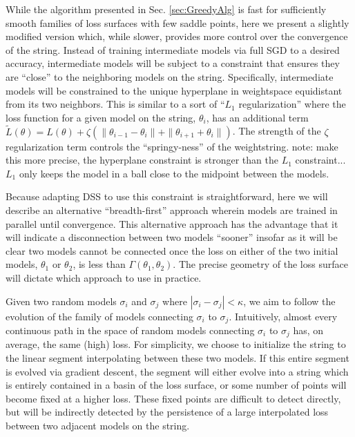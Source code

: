 \documentclass{article} %
\begin{document}
  While the algorithm presented in Sec. \ref{sec:GreedyAlg} is fast for sufficiently smooth families of loss surfaces with few saddle points, here we present a slightly modified version which, while slower, provides more control over the convergence of the string.  Instead of training intermediate models via full SGD to a desired accuracy, intermediate models will be subject to a constraint that ensures they are ``close'' to the neighboring models on the string.  Specifically, intermediate models will be constrained to the unique hyperplane in weightspace equidistant from its two neighbors.  This is similar to a sort of ``$L_1$ regularization'' where the loss function for a given model on the string, $\theta_i$, has an additional term $\tilde{L}(\theta) = L(\theta)+\zeta(\|\theta_{i-1} - \theta_i\|+\|\theta_{i+1} + \theta_i\|)$.  The strength of the $\zeta$ regularization term controls the ``springy-ness'' of the weightstring. note: make this more precise, the hyperplane constraint is stronger than the $L_1$ constraint...$L_1$ only keeps the model in a ball close to the midpoint between the models.
  
  Because adapting DSS to use this constraint is straightforward, here we will describe an alternative ``breadth-first'' approach wherein models are trained in parallel until convergence.  This alternative approach has the advantage that it will indicate a disconnection between two models ``sooner'' insofar as it will be clear two models cannot be connected once the loss on either of the two initial models, $\theta_1$ or $\theta_2$, is less than $\Gamma(\theta_1, \theta_2)$.  The precise geometry of the loss surface will dictate which approach to use in practice.
  
  Given two random models $\sigma_i$ and $\sigma_j$ where $|\sigma_i - \sigma_j| < \kappa$, we aim to follow the evolution of the family of models connecting $\sigma_i$ to $\sigma_j$.  Intuitively, almost every continuous path in the space of random models connecting $\sigma_i$ to $\sigma_j$ has, on average, the same (high) loss.  For simplicity, we choose to initialize the string to the linear segment interpolating between these two models.  If this entire segment is evolved via gradient descent, the segment will either evolve into a string which is entirely contained in a basin of the loss surface, or some number of points will become fixed at a higher loss.  These fixed points are difficult to detect directly, but will be indirectly detected by the persistence of a large interpolated loss between two adjacent models on the string.
  
\end{document}
